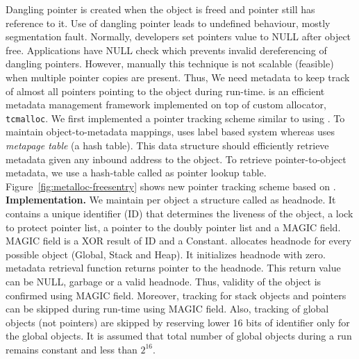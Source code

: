 Dangling pointer is created when the object is freed and pointer still has reference to it. Use of dangling pointer leads to undefined behaviour, mostly segmentation fault. Normally, developers set pointers value to NULL after object free. Applications have NULL check which prevents invalid dereferencing of dangling pointers. However, manually this technique is not scalable (feasible) when multiple pointer copies are present. Thus, We need metadata to keep track of almost all pointers pointing to the object during run-time. \metalloc{} is an efficient metadata management framework implemented on top of custom allocator, \texttt{tcmalloc}. We first implemented a pointer tracking scheme similar to \freesentry{} using \metalloc{}. To maintain object-to-metadata mappings, \freesentry{} uses label based system whereas \metalloc{} uses \textit{metapage table} (a hash table). This data structure should efficiently retrieve metadata given any inbound address to the object. To retrieve pointer-to-object metadata, we use a hash-table called as pointer lookup table. Figure~\ref{fig:metalloc-freesentry} shows new pointer tracking scheme based on \metalloc{}.\\


\textbf{Implementation.} We maintain per object a structure called as headnode. It contains a unique identifier (ID) that determines the liveness of the object, a lock to protect pointer list, a pointer to the doubly pointer list and a MAGIC field. MAGIC field is a XOR result of ID and a Constant. \metalloc{} allocates headnode for every possible object (Global, Stack and Heap). It initializes headnode with zero. \metalloc{} metadata retrieval function returns pointer to the headnode. This return value can be NULL, garbage or a valid headnode. Thus, validity of the object is confirmed using MAGIC field. Moreover, tracking for stack objects and pointers can be skipped during run-time using MAGIC field. Also, tracking of global objects (not pointers) are skipped  by reserving lower 16 bits of identifier only for the global objects. It is assumed that total number of global objects during a run remains constant and less than $2^{16}$.  \\

